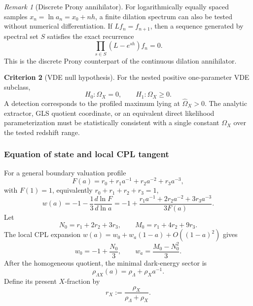 \documentclass[11pt,a4paper]{article}
\def\dd{d}%
\numberwithin{equation}{section}
\theoremstyle{definition}
\newtheorem{criterion}{Criterion}
\theoremstyle{plain}
\theoremstyle{remark}
\newtheorem{remark}[criterion]{Remark}
\newcommand{\dd}{\mathrm{d}}
\begin{document}
\begin{remark}[Discrete Prony annihilator]
For logarithmically equally spaced samples \(x_n=\ln a_n=x_0+nh\), a finite dilation spectrum can also be tested without numerical differentiation. If \(Lf_n=f_{n+1}\), then a sequence generated by spectral set \(S\) satisfies the exact recurrence
\begin{equation}
\boxed{
\prod_{s\in S}(L-e^{sh})f_n=0.
}
\end{equation}
This is the discrete Prony counterpart of the continuous dilation annihilator.
\end{remark}

\begin{criterion}[VDE null hypothesis]
For the nested positive one-parameter VDE subclass,
\begin{equation}
H_0:\Omega_X=0,
\qquad
H_1:\Omega_X\ge0.
\end{equation}
A detection corresponds to the profiled maximum lying at \(\widehat\Omega_X>0\). The analytic extractor, GLS quotient coordinate, or an equivalent direct likelihood parameterization must be statistically consistent with a single constant \(\Omega_X\) over the tested redshift range.
\end{criterion}

\subsubsection{Equation of state and local CPL tangent}
For a general boundary valuation profile
\begin{equation}
F(a)=r_0+r_1a^{-1}+r_2a^{-2}+r_3a^{-3},
\end{equation}
with \(F(1)=1\), equivalently \(r_0+r_1+r_2+r_3=1\),
\begin{equation}
w(a)=-1-\frac13\frac{\dd\ln F}{\dd\ln a}
=-1+\frac{r_1a^{-1}+2r_2a^{-2}+3r_3a^{-3}}{3F(a)}.
\end{equation}
Let
\begin{equation}
N_0=r_1+2r_2+3r_3,
\qquad
M_0=r_1+4r_2+9r_3.
\end{equation}
The local CPL expansion \(w(a)=w_0+w_a(1-a)+O((1-a)^2)\) gives
\begin{equation}
w_0=-1+\frac{N_0}{3},
\qquad
w_a=\frac{M_0-N_0^2}{3}.
\end{equation}
After the homogeneous quotient, the minimal dark-energy sector is
\begin{equation}
\rho_{\Lambda X}(a)=\rho_\Lambda+\rho_Xa^{-1}.
\end{equation}
Define its present \(X\)-fraction by
\begin{equation}
r_X:=\frac{\rho_X}{\rho_\Lambda+\rho_X}.
\end{equation}
\end{document}
